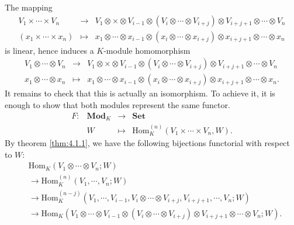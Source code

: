 \begin{proofenv}
    The mapping
    \begin{equation*}
        \begin{array}{rcl}
            V_1 \times \cdots \times V_n & \rightarrow & V_1 \otimes \times \otimes V_{i-1} \otimes \left(V_i \otimes \cdots \otimes V_{i+j}\right) \otimes V_{i+j+1} \otimes \cdots \otimes V_n\\
            (x_1 \times \cdots \times x_n) & \mapsto & x_1 \otimes \cdots \otimes x_{i-1} \otimes (x_i \otimes \cdots \otimes x_{i+j}) \otimes x_{i+j+1} \otimes \cdots \otimes x_n
        \end{array}
    \end{equation*}    
    is linear, hence induces a $K$-module homomorphism
    \begin{equation*}
        \begin{array}{rcl}
            V_1 \otimes \cdots \otimes V_n & \rightarrow & V_1 \otimes \times \otimes V_{i-1} \otimes \left(V_i \otimes \cdots \otimes V_{i+j}\right) \otimes V_{i+j+1} \otimes \cdots \otimes V_n\\
            x_1 \otimes \cdots \otimes x_n & \mapsto & x_1 \otimes \cdots \otimes x_{i-1} \otimes (x_i \otimes \cdots \otimes x_{i+j}) \otimes x_{i+j+1} \otimes \cdots \otimes x_n.
        \end{array}
    \end{equation*}
    It remains to check that this is actually an isomorphism.
    To achieve it, it is enough to show that both modules represent the same functor.
    $$\begin{array}{rrcl}
        F: & \mathbf{Mod}_{K} & \rightarrow & \mathbf{Set}\\
        & W & \mapsto & \mathrm{Hom}_{K}^{(n)} \left(V_1\times\cdots\times V_n,W\right).
    \end{array}$$
    By theorem \ref{thm:4.1.1}, we have the following bijections functorial with respect to $W$:
    \[
    \begin{aligned}
    &\mathrm{Hom}_K(V_1 \otimes \cdots \otimes V_n; W) \\
    &\rightarrow \mathrm{Hom}_K^{(n)}(V_1, \cdots, V_n; W) \\
    &\rightarrow \mathrm{Hom}_K^{(n-j)}(V_1, \cdots, V_{i-1}, V_i \otimes \cdots \otimes V_{i+j}, V_{i+j+1}, \cdots, V_n; W) \\
    &\rightarrow \mathrm{Hom}_K(V_1 \otimes \cdots \otimes V_{i-1} \otimes (V_i \otimes \cdots \otimes V_{i+j}) \otimes V_{i+j+1} \otimes \cdots \otimes V_n; W).
    \end{aligned}
    \]
\end{proofenv}

